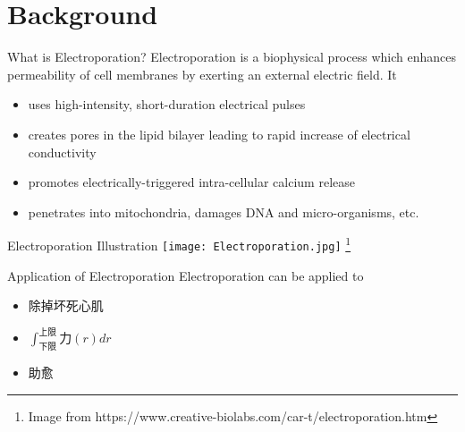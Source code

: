 \documentclass[UTF8]{ctexbeamer}
\begin{document}
\section{Background}
\frame{\tableofcontents[currentsection]}

\begin{frame}{What is Electroporation?}
	Electroporation is a biophysical process which enhances permeability of cell membranes by exerting an external electric field. It
	\begin{itemize}
		\item uses high-intensity, short-duration electrical pulses
		\item creates pores in the lipid bilayer leading to rapid increase of electrical conductivity
		\item promotes electrically-triggered intra-cellular calcium release
		\item penetrates into mitochondria, damages DNA and micro-organisms, etc.
	\end{itemize}
\end{frame}

\begin{frame}{Electroporation Illustration}
\texttt{[image: Electroporation.jpg]}
\footnote{Image from https://www.creative-biolabs.com/car-t/electroporation.htm}
\end{frame}

\begin{frame}{Application of Electroporation}
Electroporation can be applied to
\begin{itemize}
	\item 除掉坏死心肌
	\item $ \int_{下限}^{上限} 力(r)dr $
	\item 助愈
\end{itemize}
\end{frame}
\end{document}
